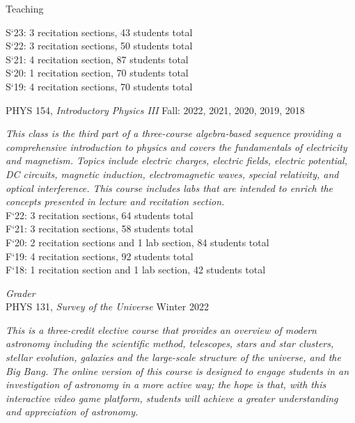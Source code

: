 \documentclass{resume} %
\newcommand{\forceindent}{\leavevmode{\parindent=1em\indent}}
\begin{document}
\begin{rSection}{Teaching}
\begin{description}[leftmargin=2em, style=nextline]
\forceindent \forceindent S`23: 3 recitation sections, 43 students total\\
\forceindent \forceindent S`22: 3 recitation sections, 50 students total\\
\forceindent \forceindent S`21: 4 recitation section, 87 students total\\
\forceindent \forceindent S`20: 1 recitation section, 70 students total\\
\forceindent \forceindent S`19: 4 recitation sections, 70 students total
\end{description}
\vspace{-0.5em}
\forceindent PHYS 154, \textit{Introductory Physics III}  \hfill {Fall: 2022, 2021, 2020, 2019, 2018}
\begin{description}[leftmargin=2em, style=nextline]
\vspace{-0.5em}
\item[~]\textit{This class is the third part of a three-course algebra-based sequence providing a comprehensive introduction to physics and covers the fundamentals of electricity and magnetism. Topics include electric charges, electric fields, electric potential, DC circuits, magnetic induction, electromagnetic waves, special relativity, and optical interference. This course includes labs that are intended to enrich the concepts presented in lecture and recitation section.} \\
\forceindent \forceindent F`22: 3 recitation sections, 64 students total\\
\forceindent \forceindent F`21: 3 recitation sections, 58 students total\\
\forceindent \forceindent F`20: 2 recitation sections and 1 lab section, 84 students total\\
\forceindent \forceindent F`19: 4 recitation sections, 92 students total\\
\forceindent \forceindent F`18: 1 recitation section and 1 lab section, 42 students total
\end{description}
\vspace{-0.5em}
\textit{Grader} \\
\forceindent PHYS 131, \textit{Survey of the Universe} \hfill {Winter 2022}
\begin{description}[leftmargin=2em, style=nextline]
\vspace{-0.5em}
\item[~]\textit{This is a three-credit elective course that provides an overview of modern astronomy including the scientific method, telescopes, stars and star clusters, stellar evolution, galaxies and the large-scale structure of the universe, and the Big Bang. The online version of this course is designed to engage students in an investigation of astronomy in a more active way; the hope is that, with this interactive video game platform, students will achieve a greater understanding and appreciation of astronomy.}

\end{description}
\end{rSection}
\end{document}
